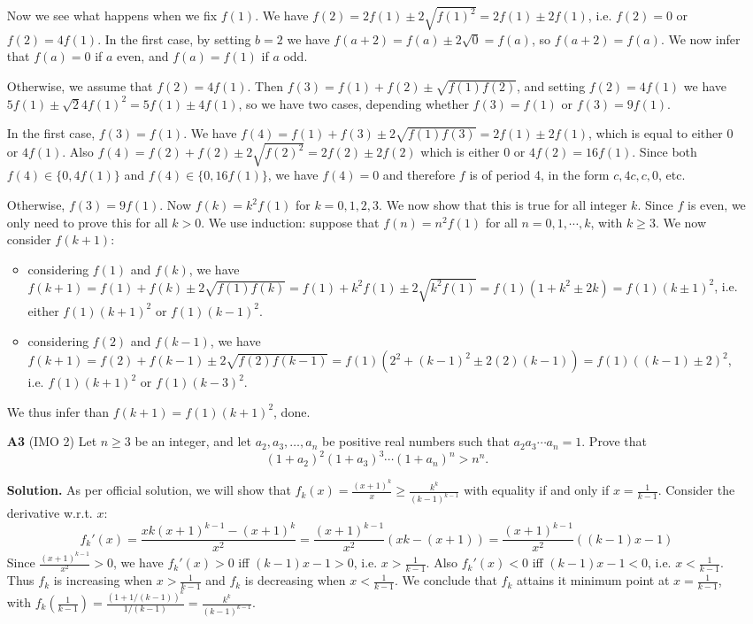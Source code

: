 \documentclass[11pt,a4paper]{article}
\begin{document}
\begin{enumerate}
	Now we see what happens when we fix $f(1)$. We have $f(2)=2f(1)\pm 2\sqrt{f(1)^2}=2f(1)\pm 2f(1)$, i.e. $f(2)=0$ or $f(2)=4f(1)$. 
	In the first case, by setting $b=2$ we have $f(a+2)=f(a)\pm 2\sqrt{0}=f(a)$, so $f(a+2)=f(a)$. 
	We now infer that $f(a)=0$ if $a$ even, and $f(a)=f(1)$ if $a$ odd. 
	
	Otherwise, we assume that $f(2)=4f(1)$. Then $f(3)=f(1)+f(2)\pm\sqrt{f(1)f(2)}$, and setting $f(2)=4f(1)$ we have $5f(1)\pm\sqrt2{4f(1)^2}=5f(1)\pm 4f(1)$, so we have two cases, depending whether $f(3)=f(1)$ or $f(3)=9f(1)$. 
	
	In the first case, $f(3)=f(1)$. We have $f(4)=f(1)+f(3)\pm 2\sqrt{f(1)f(3)}=2f(1)\pm 2f(1)$, which is equal to either $0$ or $4f(1)$. Also $f(4)=f(2)+f(2)\pm 2\sqrt{f(2)^2}=2f(2)\pm 2f(2)$ which is either $0$ or $4f(2)=16f(1)$. Since both $f(4)\in \{0, 4f(1)\}$ and $f(4)\in \{0, 16f(1)\}$, we have $f(4)=0$ and therefore $f$ is of period 4, in the form $c, 4c, c, 0$, etc. 
	
	Otherwise, $f(3)=9f(1)$. Now $f(k)=k^2f(1)$ for $k=0, 1, 2, 3$. We now show that this is true for all integer $k$. Since $f$ is even, we only need to prove this for all $k>0$. 
	We use induction: suppose that $f(n)=n^2f(1)$ for all $n=0, 1, \cdots , k$, with $k\ge 3$. We now consider $f(k+1)$: 
	\begin{itemize}
		\item considering $f(1)$ and $f(k)$, we have $f(k+1)=f(1)+f(k)\pm 2\sqrt{f(1)f(k)}=f(1)+k^2f(1)\pm 2\sqrt{k^2f(1)}=f(1)(1+k^2\pm 2k)=f(1)(k\pm 1)^2$, i.e. either $f(1)(k+1)^2$ or $f(1)(k-1)^2$. 
		
		\item considering $f(2)$ and $f(k-1)$, we have $f(k+1)=f(2)+f(k-1)\pm 2\sqrt{f(2)f(k-1)}=f(1)(2^2+(k-1)^2\pm 2(2)(k-1))=f(1)((k-1)\pm 2)^2$, i.e. $f(1)(k+1)^2$ or $f(1)(k-3)^2$. 
		
	\end{itemize}
	We thus infer than $f(k+1)=f(1)(k+1)^2$, done. 
	
	\item[\textbf{A3}] (IMO 2) Let $n\ge 3$ be an integer, and let $a_2,a_3,\ldots ,a_n$ be positive real numbers such that $a_{2}a_{3}\cdots a_{n}=1$. Prove that
	\[(1 + a_2)^2 (1 + a_3)^3 \dotsm (1 + a_n)^n > n^n.\]
	
	\textbf{Solution.} As per official solution, we will show that $f_k(x)=\frac{(x+1)^k}{x}\ge \frac{k^k}{(k-1)^{k-1}}$ with equality if and only if $x=\frac{1}{k-1}$. 
	Consider the derivative w.r.t. $x$: \[f_k'(x)=\frac{xk(x+1)^{k-1}-(x+1)^k}{x^2}=\frac{(x+1)^{k-1}}{x^2}(xk-(x+1))=\frac{(x+1)^{k-1}}{x^2}((k-1)x-1)\] 
	Since $\frac{(x+1)^{k-1}}{x^2}>0$, we have $f_k'(x)>0$ iff $(k-1)x-1>0$, i.e. $x>\frac{1}{k-1}$. Also $f_k'(x)<0$ iff $(k-1)x-1<0$, i.e. $x<\frac{1}{k-1}$. Thus $f_k$ is increasing when $x>\frac{1}{k-1}$ and $f_k$ is decreasing when $x<\frac{1}{k-1}$. We conclude that $f_k$ attains it minimum point at $x=\frac{1}{k-1}$, with $f_k(\frac{1}{k-1})=\frac{(1+1/(k-1))^k}{1/(k-1)}=\frac{k^k}{(k-1)^{k-1}}$. 
	

\end{enumerate}
\end{document}
